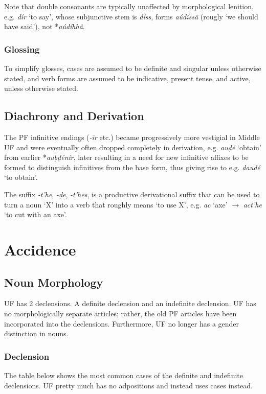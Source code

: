 \documentclass[a4paper, 12pt, twoside, final]{article}
\let \w \textit
\begin{document}
\noindent Note that double consonants are typically unaffected by morphological lenition, e.g. \w{dír} ‘to say’,
whose subjunctive stem is \w{díss}, forms \w{aúdíssâ} (rougly ‘we should have said’), not *\w{aúdíhhâ}.

\subsubsection{Glossing}
To simplify glosses, cases are assumed to be definite and singular unless otherwise stated, and verb forms are
assumed to be indicative, present tense, and active, unless otherwise stated.

\subsection{Diachrony and Derivation}
The PF infinitive endings (\w{-ir} etc.) became progressively more vestigial in Middle UF and were eventually
often dropped completely in derivation, e.g. \w{auḍé} ‘obtain’ from earlier *\w{auḅḍénír}, later resulting in
a need for new infinitive affixes to be formed to distinguish infinitives from the base form, thus giving
rise to e.g. \w{dauḍé} ‘to obtain’.

The suffix \w{-t’he},  \w{-ḍe},  \w{-t’hes}, is a productive derivational suffix that can be used to turn a
noun ‘X’ into a verb that roughly means ‘to use X’, e.g. \w{ac} ‘axe’ $\to$ \w{act’he} ‘to cut with an axe’.

\section{Accidence}\label{sec:accidence}

\subsection{Noun Morphology}\label{subsec:noun-morphology}
UF has 2 declensions. A definite declension and an indefinite declension.
UF has no morphologically separate articles; rather, the old PF articles have been incorporated
into the declensions. Furthermore, UF no longer has a gender distinction in nouns.

\subsubsection{Declension}\label{subsubsec:declension}
The table below shows the most common cases of the definite and indefinite declensions. UF pretty much has no
adpositions and instead uses cases instead.
\end{document}
